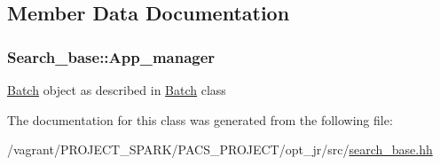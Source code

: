 \subsection{Member Data Documentation}
\hypertarget{classSearch__base_ad4cadf0273cce78e1ae9920bd9100e7a}{
\subsubsection[{App\-\_\-manager}]{ Search\-\_\-base\-::\-App\-\_\-manager\hspace{0.3cm}{\ttfamily [protected]}}}\label{classSearch__base_ad4cadf0273cce78e1ae9920bd9100e7a}
\hyperlink{classBatch}{Batch} object as described in \hyperlink{classBatch}{Batch} class 

The documentation for this class was generated from the following file\-:\begin{DoxyCompactItemize}
\item 
/vagrant/\-P\-R\-O\-J\-E\-C\-T\-\_\-\-S\-P\-A\-R\-K/\-P\-A\-C\-S\-\_\-\-P\-R\-O\-J\-E\-C\-T/opt\-\_\-jr/src/\hyperlink{search__base_8hh}{search\-\_\-base.\-hh}\end{DoxyCompactItemize}
